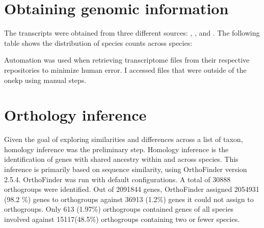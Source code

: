 \section{Obtaining genomic information}

The transcripts were obtained from three different sources: \cite{One_Thousand_Plant_Transcriptomes_Initiative2019-gy}, \cite{Marchant2021-kp}, and \cite{Pelosi2022-rr}. 
The following table shows the distribution of species counts across species:

\begin{table}[]
	\centering
	\caption{The distribution of the numbers of samples across their sources.
	}
	\label{Table 41}
	\end{table}

Automation was used when retrieving transcriptome files from their respective repositories to minimize human error. I accessed files that were outside of the onekp using manual steps.

\section{Orthology inference}

Given the goal of exploring similarities and differences across a list of taxon, homology inference was the preliminary step. Homology inference is the identification of genes with shared ancestry within and across species. This inference is primarily based on sequence similarity, using OrthoFinder \cite{Emms2019-cd} version 2.5.4. OrthoFinder was run with default configurations. A total of 30888 orthogroups were identified. Out of 2091844 genes, OrthoFinder assigned 2054931 (98.2 \%) genes to orthogroups against 36913 (1.2\%) genes it could not assign to orthogroups. 
Only 613 (1.97\%) orthogroups contained genes of all species involved against 15117(48.5\%) orthogroups containing two or fewer species.

